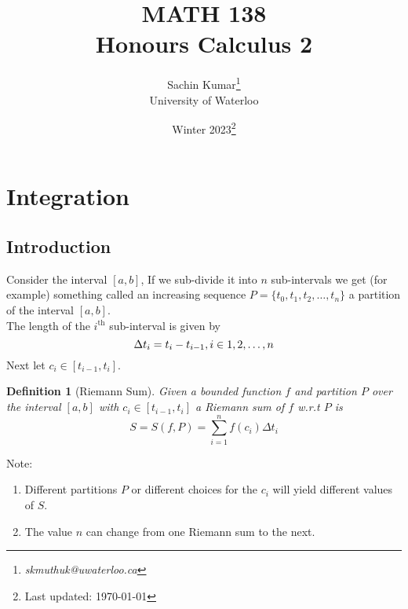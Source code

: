\documentclass[10pt]{article}
\theoremstyle{break}
\newtheorem{defn}{Definition}[subsection]
\newcommand{\subject}{MATH 138 \\ Honours Calculus 2}
\newcommand{\semester}{Winter 2023}
\begin{document}
\let\ref\Cref

\title{\subject}
\author{Sachin Kumar\thanks{\itshape skmuthuk@uwaterloo.ca}\\ University of Waterloo}
\date{\semester\thanks{Last updated: \today}}

\maketitle
\newpage
\tableofcontents
\newpage

\section{Integration}

\subsection{Introduction}
Consider the interval $[a, b]$,
If we sub-divide it into $n$ sub-intervals we get (for example) something called an increasing sequence $P = \{t_0, t_1, t_2, \dots, t_n\}$ a partition of the interval $[a, b]$. \\
The length of the $i^{\text{th}}$ sub-interval is given by $$\Delta t_i = t_i - t_{i-1}, \space \space i \in 1, 2, \dots, n$$
Next let $c_i \in [t_{i-1}, t_i]$.

\begin{defn}[Riemann Sum]
    Given a bounded function $f$ and partition $P$ over the interval $[a, b]$ with $c_i \in [t_{i-1}, t_i]$ a Riemann sum of $f$ w.r.t  $P$ is $$S = S(f, P) = \sum^{n}_{i=1}f(c_i)\Delta t_i$$
\end{defn}
Note:
\begin{enumerate}
    \item Different partitions $P$ or different choices for the $c_i$ will yield different values of $S$.
    \item The value $n$ can change from one Riemann sum to the next.
\end{enumerate}
\end{document}
